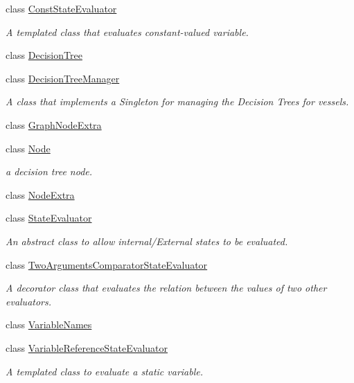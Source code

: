 \begin{DoxyCompactItemize}
\item 
class \mbox{\hyperlink{classdtree_1_1_const_state_evaluator}{Const\+State\+Evaluator}}
\begin{DoxyCompactList}\small\item\em A templated class that evaluates constant-\/valued variable. \end{DoxyCompactList}\item 
class \mbox{\hyperlink{classdtree_1_1_decision_tree}{Decision\+Tree}}
\item 
class \mbox{\hyperlink{classdtree_1_1_decision_tree_manager}{Decision\+Tree\+Manager}}
\begin{DoxyCompactList}\small\item\em A class that implements a Singleton for managing the Decision Trees for vessels. \end{DoxyCompactList}\item 
class \mbox{\hyperlink{classdtree_1_1_graph_node_extra}{Graph\+Node\+Extra}}
\item 
class \mbox{\hyperlink{classdtree_1_1_node}{Node}}
\begin{DoxyCompactList}\small\item\em a decision tree node. \end{DoxyCompactList}\item 
class \mbox{\hyperlink{classdtree_1_1_node_extra}{Node\+Extra}}
\item 
class \mbox{\hyperlink{classdtree_1_1_state_evaluator}{State\+Evaluator}}
\begin{DoxyCompactList}\small\item\em An abstract class to allow internal/\+External states to be evaluated. \end{DoxyCompactList}\item 
class \mbox{\hyperlink{classdtree_1_1_two_arguments_comparator_state_evaluator}{Two\+Arguments\+Comparator\+State\+Evaluator}}
\begin{DoxyCompactList}\small\item\em A decorator class that evaluates the relation between the values of two other evaluators. \end{DoxyCompactList}\item 
class \mbox{\hyperlink{classdtree_1_1_variable_names}{Variable\+Names}}
\item 
class \mbox{\hyperlink{classdtree_1_1_variable_reference_state_evaluator}{Variable\+Reference\+State\+Evaluator}}
\begin{DoxyCompactList}\small\item\em A templated class to evaluate a static variable. \end{DoxyCompactList}\end{DoxyCompactItemize}

